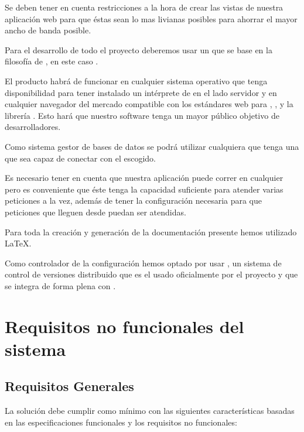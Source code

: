 Se deben tener en cuenta restricciones a la hora de crear las vistas de nuestra
aplicación web para que éstas sean lo mas livianas posibles para ahorrar el
mayor ancho de banda posible.

Para el desarrollo de todo el proyecto deberemos usar un  que se
base en la filosofía de , en este caso
.

El producto habrá de funcionar en cualquier sistema operativo que tenga
disponibilidad para tener instalado un intérprete de  en el lado
servidor y en cualquier navegador del mercado compatible con los estándares web
para , , y la librería . Esto
hará que nuestro software tenga un mayor público objetivo de desarrolladores.

Como sistema gestor de bases de datos se podrá utilizar cualquiera que tenga una
 que sea capaz de conectar  con el 
escogido.

Es necesario tener en cuenta que nuestra aplicación puede correr en cualquier
 pero es conveniente que éste tenga la capacidad suficiente para
atender varias peticiones a la vez, además de tener la configuración necesaria
para que peticiones que lleguen desde  puedan ser atendidas.

Para toda la creación y generación de la documentación presente hemos utilizado
LaTeX.

Como controlador de la configuración hemos optado por usar , un
sistema de control de versiones distribuido que es el usado oficialmente por el
proyecto  y que se integra de forma plena con .

\section{Requisitos no funcionales del sistema}
\subsection{Requisitos Generales}
La solución debe cumplir como mínimo con las siguientes características basadas
en las especificaciones funcionales y los requisitos no funcionales:

